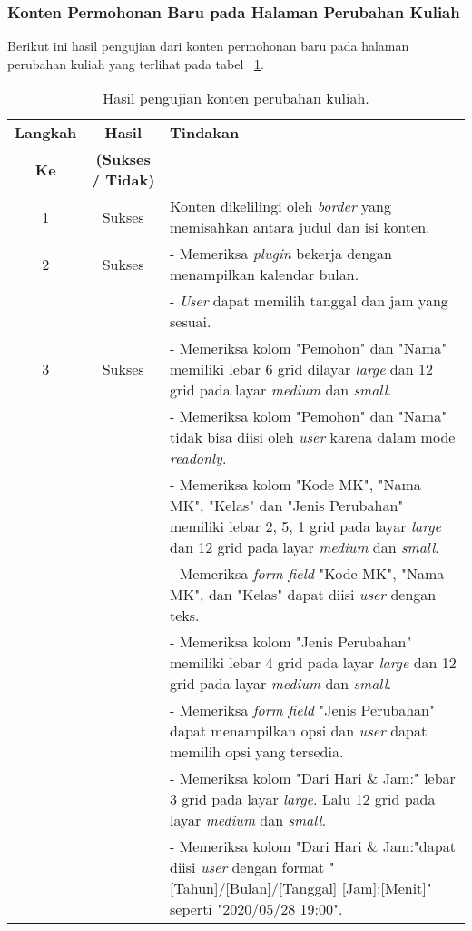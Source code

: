 \subsubsection{Konten Permohonan Baru pada Halaman Perubahan Kuliah}
Berikut ini hasil pengujian dari konten permohonan baru pada halaman perubahan kuliah yang terlihat pada tabel ~\ref{hasil:PermohonanPerubahanKuliah}.
\begin{table}[H]	
	\centering
	\caption{Hasil pengujian konten perubahan kuliah.}
	\label{hasil:PermohonanPerubahanKuliah}
		\begin{tabular}{|c| c| p{}|}				
			\toprule
			\textbf{Langkah} & \textbf{Hasil} & \textbf{Tindakan}\\
			\textbf{Ke} & \textbf{(Sukses / Tidak)} &\\
			\midrule
			1&Sukses&Konten dikelilingi oleh \textit{border} yang memisahkan antara judul dan isi konten.\\
			\hline
			2&Sukses&- Memeriksa \textit{plugin} bekerja dengan menampilkan kalendar bulan.\\
			&&- \textit{User} dapat memilih tanggal dan jam yang sesuai.\\
			\hline
			3&Sukses& - Memeriksa kolom "Pemohon" dan "Nama" memiliki lebar 6 grid dilayar \textit{large} dan 12 grid pada layar \textit{medium} dan \textit{small}.\\
			&& - Memeriksa kolom "Pemohon" dan "Nama" tidak bisa diisi oleh \textit{user} karena dalam mode \textit{readonly}.\\
			
			&& - Memeriksa kolom "Kode MK", "Nama MK", "Kelas" dan "Jenis Perubahan" memiliki lebar 2, 5, 1 grid pada layar \textit{large} dan 12 grid pada layar \textit{medium} dan \textit{small}.\\
			&& - Memeriksa \textit{form field} "Kode MK", "Nama MK", dan "Kelas" dapat diisi \textit{user} dengan teks.\\
			
			&& - Memeriksa kolom "Jenis Perubahan" memiliki lebar 4 grid pada layar \textit{large} dan 12 grid pada layar \textit{medium} dan \textit{small}.\\
			&& - Memeriksa \textit{form field} "Jenis Perubahan" dapat menampilkan opsi dan \textit{user} dapat memilih opsi yang tersedia.\\
			
			&& - Memeriksa kolom "Dari Hari \& Jam:" lebar 3 grid pada layar \textit{large}. Lalu 12 grid pada layar \textit{medium} dan \textit{small}.\\
			&& - Memeriksa kolom "Dari Hari \& Jam:"dapat diisi \textit{user} dengan format "[Tahun]/[Bulan]/[Tanggal] [Jam]:[Menit]" seperti "2020/05/28 19:00".\\
			

\end{tabular}
\end{table}
